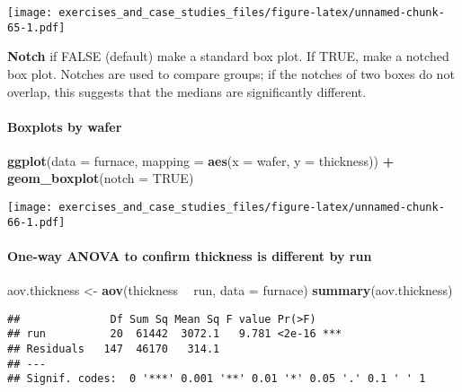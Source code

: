 \documentclass[]{book}
\newenvironment{Shaded}{\begin{snugshade}}{\end{snugshade}}
\newcommand{\DataTypeTok}[1]{\textcolor[rgb]{0.13,0.29,0.53}{#1}}
\newcommand{\KeywordTok}[1]{\textcolor[rgb]{0.13,0.29,0.53}{\textbf{#1}}}
\newcommand{\NormalTok}[1]{#1}
\newcommand{\OperatorTok}[1]{\textcolor[rgb]{0.81,0.36,0.00}{\textbf{#1}}}
\newcommand{\OtherTok}[1]{\textcolor[rgb]{0.56,0.35,0.01}{#1}}
\newcommand{\StringTok}[1]{\textcolor[rgb]{0.31,0.60,0.02}{#1}}
\let\oldparagraph\paragraph
\renewcommand{\paragraph}[1]{\oldparagraph{#1}\mbox{}}
\theoremstyle{definition}
\theoremstyle{definition}
\theoremstyle{definition}
\theoremstyle{remark}
\begin{document}
\texttt{[image: exercises\_and\_case\_studies\_files/figure-latex/unnamed-chunk-65-1.pdf]}

\textbf{Notch} if FALSE (default) make a standard box plot. If TRUE,
make a notched box plot. Notches are used to compare groups; if the
notches of two boxes do not overlap, this suggests that the medians are
significantly different.

\hypertarget{boxplots-by-wafer}{%
\paragraph{Boxplots by wafer}\label{boxplots-by-wafer}}

\begin{Shaded}
\begin{Highlighting}[]
\KeywordTok{ggplot}\NormalTok{(}\DataTypeTok{data =}\NormalTok{ furnace, }\DataTypeTok{mapping =} \KeywordTok{aes}\NormalTok{(}\DataTypeTok{x =}\NormalTok{ wafer, }\DataTypeTok{y =}\NormalTok{ thickness)) }\OperatorTok{+}
\StringTok{  }\KeywordTok{geom_boxplot}\NormalTok{(}\DataTypeTok{notch =} \OtherTok{TRUE}\NormalTok{)}
\end{Highlighting}
\end{Shaded}

\texttt{[image: exercises\_and\_case\_studies\_files/figure-latex/unnamed-chunk-66-1.pdf]}

\hypertarget{one-way-anova-to-confirm-thickness-is-different-by-run}{%
\paragraph{One-way ANOVA to confirm thickness is different by
run}\label{one-way-anova-to-confirm-thickness-is-different-by-run}}

\begin{Shaded}
\begin{Highlighting}[]
\NormalTok{aov.thickness <-}\StringTok{ }\KeywordTok{aov}\NormalTok{(thickness }\OperatorTok{~}\StringTok{ }\NormalTok{run, }\DataTypeTok{data =}\NormalTok{ furnace)}
\KeywordTok{summary}\NormalTok{(aov.thickness)}
\end{Highlighting}
\end{Shaded}

\begin{verbatim}
##              Df Sum Sq Mean Sq F value Pr(>F)    
## run          20  61442  3072.1   9.781 <2e-16 ***
## Residuals   147  46170   314.1                   
## ---
## Signif. codes:  0 '***' 0.001 '**' 0.01 '*' 0.05 '.' 0.1 ' ' 1
\end{verbatim}
\end{document}
